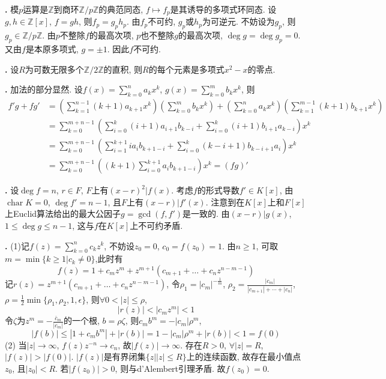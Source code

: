 \par \textbf{\thesolpoly .} 模$p$运算是$\mathbb{Z}$到商环$\mathbb{Z}/p\mathbb{Z}$的典范同态, $f \mapsto f_p$是其诱导的多项式环同态. 设$g,h \in \mathbb{Z}[x]$, $f=gh$, 则$f_p=g_ph_p$. 由$f_p$不可约, $g_p$或$h_p$为可逆元. 不妨设为$g_p$, 则$g_p\in \mathbb{Z}/p\mathbb{Z}$. 由$p$不整除$f$的最高次项, $p$也不整除$g$的最高次项, $\deg g=\deg g_p=0$. 又由$f$是本原多项式, $g=\pm 1$. 因此$f$不可约. 

\par \textbf{\thesolpoly .} 设$R$为可数无限多个$\mathbb{Z}/2\mathbb{Z}$的直积, 则$R$的每个元素是多项式$x^2-x$的零点. 

\par \textbf{\thesolpoly .} 加法的部分显然. 设$f(x)=\sum_{k=0}^n a_kx^k$, $g(x)=\sum_{k=0}^m b_kx^k$, 则
\begin{align*}
f'g+fg' &= \left(\sum_{k=1}^{n-1} (k+1)a_{k+1}x^k\right)\left(\sum_{k=0}^m b_kx^k\right)+\left(\sum_{k=0}^n a_kx^k\right)\left(\sum_{k=1}^{m-1} (k+1)b_{k+1}x^k\right)\\
&= \sum_{k=0}^{m+n-1} \left(\sum_{i=0}^k (i+1)a_{i+1}b_{k-i} + \sum_{i=0}^k (i+1)b_{i+1}a_{k-i}\right) x^k \\ 
&= \sum_{k=0}^{m+n-1} \left(\sum_{i=1}^{k+1} i a_{i}b_{k+1-i} + \sum_{i=0}^k (k-i+1)b_{k-i+1}a_i\right) x^k\\
&= \sum_{k=0}^{m+n-1} \left((k+1)\sum_{i=0}^{k+1} a_ib_{k+1-i} \right)x^k = (fg)'
\end{align*}

\par \textbf{\thesolpoly .} 设$\deg f=n$, $r\in F$, $F$上有$(x-r)^2\vert f(x)$. 考虑$f$的形式导数$f'\in K[x]$, 由$\operatorname{char}K=0$, $\deg f'=n-1$, 且$F$上有$(x-r)\vert f'(x)$. 注意到在$K[x]$上和$F[x]$上Euclid算法给出的最大公因子$g=\gcd(f,f')$是一致的. 由$(x-r)\vert g(x)$, $1\le \deg g\le n-1$, 这与$f$在$K[x]$上不可约矛盾. 

\par \textbf{\thesolpoly .} \cite{PFTB}  (1)记$f(z)=\sum_{k=0}^n c_k z^k$, 不妨设$z_0=0$, $c_0=f(z_0)=1$. 由$n\ge 1$, 可取$m=\min\{k\ge 1\vert c_k\neq 0\}$,此时有
\begin{equation*}
    f(z)=1+c_mz^m + z^{m+1} (c_{m+1}+\dots+c_nz^{n-m-1})
\end{equation*}
记$r(z)= z^{m+1} (c_{m+1}+\dots+c_nz^{n-m-1})$, 令$\rho_1=|c_m|^{-\frac{1}{m}}$, $\rho_2= \frac{|c_m|}{|c_{m+1}|+\cdots+|c_n|}$, $\rho=\frac{1}{2}\min\{\rho_1, \rho_2,1,\epsilon\}$, 则$\forall 0 < |z| \le \rho$, 
\begin{equation*}
    |r(z)|<|c_mz^m|<1
\end{equation*}
令$\zeta$为$z^m = -\frac{\bar{c}_m}{|c_m|}$的一个根, $b=\rho\zeta$, 则$c_m b^m = -|c_m|\rho^m$, 
\begin{equation*}
|f(b)|\le |1+c_mb^m|+|r(b)|=1-|c_m|\rho^m + |r(b)| < 1 = f(0)
\end{equation*}
(2) 当$|z|\to \infty$, $f(z)z^{-n} \to c_n$, 故$|f(z)|\to \infty$. 存在$R>0$, $\forall |z|=R$, $|f(z)|>|f(0)|$. $|f(z)|$是有界闭集$\{z||z|\le R\}$上的连续函数, 故存在最小值点$z_0$, 且$|z_0|<R$. 若$|f(z_0)|>0$, 则与d'Alembert引理矛盾. 故$f(z_0)=0$. 


